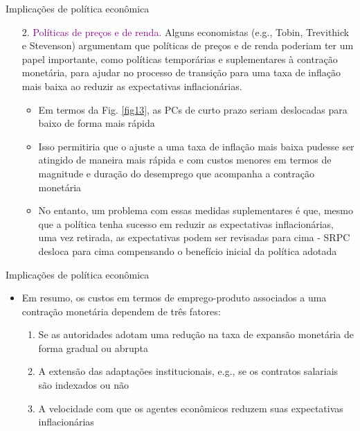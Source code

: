 \documentclass[10pt]{beamer}
\begin{document}
\begin{frame}{Implicações de política econômica}
            \begin{enumerate}            
            \item[2.] \textcolor{purple}{Políticas de preços e de renda.} Alguns economistas (e.g., Tobin, Trevithick e Stevenson) argumentam que políticas de preços e de renda poderiam ter um papel importante, como políticas temporárias e suplementares à contração monetária, para ajudar no processo de transição para uma taxa de inflação mais baixa ao reduzir as expectativas inflacionárias.
            \bigskip
            \begin{itemize}
                \item Em termos da Fig. \ref{fig13}, as PCs de curto prazo seriam deslocadas para baixo de forma mais rápida
                \bigskip
                \item Isso permitiria que o ajuste a uma taxa de inflação mais baixa pudesse ser atingido de maneira mais rápida e com custos menores em termos de magnitude e duração do desemprego que acompanha a contração monetária
                \bigskip
                \item No entanto, um problema com essas medidas suplementares é que, mesmo que a política tenha sucesso em reduzir as expectativas inflacionárias, uma vez retirada, as expectativas podem ser revisadas para cima - SRPC desloca para cima compensando o benefício inicial da política adotada
            \end{itemize}
        \end{enumerate}    
\end{frame}

\begin{frame}{Implicações de política econômica}
    \begin{itemize}
        \item Em resumo, os custos em termos de emprego-produto associados a uma contração monetária dependem de três fatores:
        \bigskip
        \begin{enumerate}
            \item Se as autoridades adotam uma redução na taxa de expansão monetária de forma gradual ou abrupta
            \bigskip
            \item A extensão das adaptações institucionais, e.g., se os contratos salariais são indexados ou não
            \bigskip
            \item A velocidade com que os agentes econômicos reduzem suas expectativas inflacionárias
        \end{enumerate}
    \end{itemize}    
\end{frame}
\end{document}
